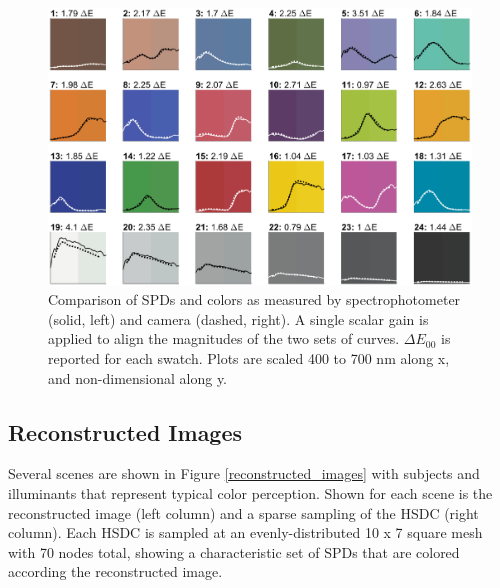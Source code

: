 \documentclass[twocolumn,10pt]{asme2ej}
\begin{document}
\begin{figure}[H]
\begin{centering}
  \includegraphics[height=0.60\linewidth]{colorchecker_SPDs.eps}
    \caption{Comparison of SPDs and colors as measured by spectrophotometer (solid, left) and camera (dashed, right). A single scalar gain is applied to align the magnitudes of the two sets of curves. $\Delta E_{00}$ is reported for each swatch. Plots are scaled 400 to 700 nm along x, and non-dimensional along y.}
  \label{colorchecker_SPDs}
    \end{centering}
\end{figure}



\clearpage

\subsection{Reconstructed Images}


Several scenes are shown in Figure \ref{reconstructed_images} with subjects and illuminants that represent typical color perception. Shown for each scene is the reconstructed image (left column) and a sparse sampling of the HSDC (right column). Each HSDC is sampled at an evenly-distributed 10 x 7 square mesh with 70 nodes total, showing a characteristic set of SPDs that are colored according the reconstructed image.
\end{document}
